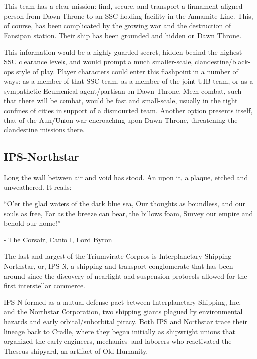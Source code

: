 This team has a clear mission: find, secure, and transport a firmament-aligned person from Dawn
Throne to an SSC holding facility in the Annamite Line. This, of course, has been complicated by
the growing war and the destruction of Fansipan station. Their ship has been grounded and
hidden on Dawn Throne.

This information would be a highly guarded secret, hidden behind the highest SSC clearance
levels, and would prompt a much smaller-scale, clandestine/black-ops style of play. Player
characters could enter this flashpoint in a number of ways: as a member of that SSC team, as a
member of the joint UIB team, or as a sympathetic Ecumenical agent/partisan on Dawn Throne.
Mech combat, such that there will be combat, would be fast and small-scale, usually in the tight
confines of cities in support of a dismounted team.  Another option presents itself, that of the
Aun/Union war encroaching upon Dawn Throne, threatening the clandestine missions there.

\subsection{IPS-Northstar}
\begin{loreQuote}
              Long the wall between air and void has stood. An upon it, a plaque, etched
              and unweathered. It reads:
\begin{loreQuote}
              ``O'er the glad waters of the dark blue sea,
              Our thoughts as boundless, and our souls as free,
              Far as the breeze can bear, the billows foam,
              Survey our empire and behold our home!''

              \qquad - \quad The Corsair, Canto I, Lord Byron
\end{loreQuote}
\end{loreQuote}

The last and largest of the Triumvirate Corpros is Interplanetary Shipping-Northstar, or, IPS-N, a
shipping and transport conglomerate that has been around since the discovery of nearlight and
suspension protocols allowed for the first interstellar commerce.

IPS-N formed as a mutual defense pact between Interplanetary Shipping, Inc, and the Northstar
Corporation, two shipping giants plagued by environmental hazards and early orbital/suborbital
piracy. Both IPS and Northstar trace their lineage back to Cradle, where they began initially as
shipwright unions that organized the early engineers, mechanics, and laborers who reactivated
the Theseus shipyard, an artifact of Old Humanity.

